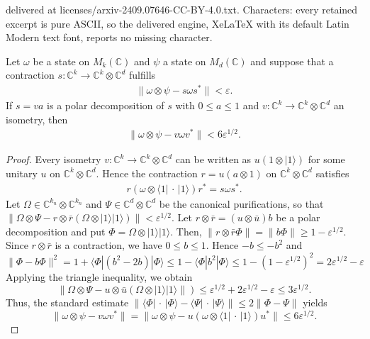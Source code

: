 \documentclass[10pt,a4paper]{amsart}
\def\CC{{\mathbb C}}
\newcommand{\bra}[1]{\langle#1|}
\newcommand{\eps}{\varepsilon}
\newcommand{\ket}[1]{|#1\rangle}
\newcommand{\norm}[1]{\lVert #1\rVert}
\newcommand{\ox}{\otimes}
\newcommand{\placeholder}[0]{{\,\cdot\,}}
\begin{document}
delivered at licenses/arxiv-2409.07646-CC-BY-4.0.txt. Characters: every retained excerpt is pure ASCII, so the delivered engine, XeLaTeX with its default Latin Modern text font, reports no missing character.
\begin{lemma}\label{lem:contractions}
    Let $\omega$ be a state on $M_k(\CC)$ and $\psi$ a state on $M_d(\CC)$ and suppose that a contraction $s:\CC^k\to \CC^k\ox \CC^d$ fulfills
    \begin{align}
        \norm{\omega\ox \psi - s \omega s^*}<\eps.
    \end{align}
    If $s=va$ is a polar decomposition of $s$ with $0\leq a\leq 1$ and $v:\CC^k\to \CC^k\ox \CC^d$ an isometry, then
      \begin{align}
        \norm{\omega\ox \psi - v\omega v^*}<6\eps^{1/2}.
    \end{align}
\end{lemma}

\begin{proof}
    Every isometry $v:\CC^k\to \CC^k\ox \CC^d$ can be written as $u(1\ox \ket 1)$ for some unitary $u$ on $\CC^k\ox \CC^d$.
    Hence the contraction $r= u(a\ox 1)$ on $\CC^k\ox \CC^d$ satisfies
    \begin{align}
        r(\omega \ox \bra1\placeholder\ket1)r^* = s\omega s^*. 
    \end{align}
    Let $\Omega\in\CC^{k_n}\otimes\CC^{k_n}$ and $\Psi\in\CC^d\ox\CC^d$ be the canonical purifications, so that $\norm{\Omega \ox\Psi - r\ox\bar r(\Omega\ox \ket1\ket1)}< \eps^{1/2}$.
    Let $r\ox\bar r= (u\ox \bar u)b$ be a polar decomposition and put $\Phi=\Omega\ox\ket1\ket1$.
    Then, $\norm{r\ox\bar r \Phi}=\norm{b\Phi} \ge 1-\eps^{1/2}$.
    Since $r\ox\bar r$ is a contraction, we have $0\leq b\leq 1$. Hence $-b \le -b^2$ and
    \begin{equation*}
        \norm{\Phi-b\Phi}^2 = 1 + \bra{\Phi}(b^2-2b)\ket{\Phi}  \le 1- \bra{\Phi}b^2\ket{\Phi} \le 1- (1-\eps^{1/2})^2 = 2\eps^{1/2}-\eps
    \end{equation*}
    Applying the triangle inequality, we obtain 
    \begin{equation*}
        \norm{\Omega\ox\Psi-u\ox\bar u(\Omega\ox\ket1\ket1} )
        \le \eps^{1/2} + 2\eps^{1/2} -\eps \le 3\eps^{1/2}.
    \end{equation*}
    Thus, the standard estimate $\norm{\bra\Phi\placeholder\ket\Phi-\bra\Psi\placeholder\ket\Psi} \le 2 \norm{\Phi-\Psi}$ yields
    \begin{equation*}
     \norm{\omega\ox\psi - v\omega v^*} = \norm{\omega\ox\psi - u(\omega\ox\bra1\placeholder\ket1)u^*} \le 6 \eps^{1/2}.
    \end{equation*}
\end{proof}
\end{document}
